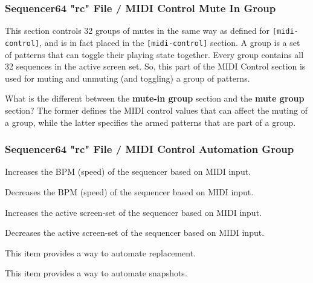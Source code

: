 \subsubsection{Sequencer64 "rc" File / MIDI Control Mute In Group}
\label{subsubsec:seq64_rc_file_midi_control_mute_in_group}

   This section controls 32 groups of mutes in the same way as 
   defined for \texttt{[midi-control]}, and is in fact placed in the
   \texttt{[midi-control]} section.
   A group is a set of patterns that can toggle their playing state
   together.  Every group contains all 32 sequences in the active screen set.
   So, this part of the MIDI Control section is used for muting and unmuting
   (and toggling) a group of patterns.

   What is the different between the \textbf{mute-in group}
   section and the \textbf{mute group} section?  The former defines the MIDI
   control values that can affect the muting of a group, while the latter
   specifies the armed patterns that are part of a group.

\subsubsection{Sequencer64 "rc" File / MIDI Control Automation Group}
\label{subsubsec:seq64_rc_file_midi_control_automation_group}


   \setcounter{ItemCounter}{0}      %

   Increases the BPM (speed) of the sequencer based on MIDI input.

   Decreases the BPM (speed) of the sequencer based on MIDI input.

   Increases the active screen-set of the sequencer based on MIDI input.

   Decreases the active screen-set of the sequencer based on MIDI input.

   This item provides a way to automate replacement.

   This item provides a way to automate snapshots.

